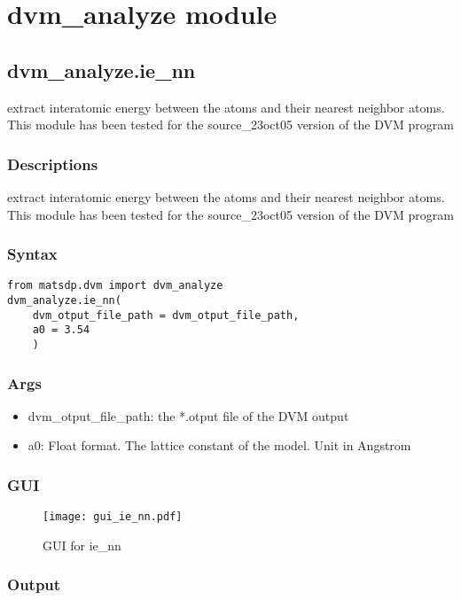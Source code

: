 \documentclass[12pt]{book}
\begin{document}
\section{dvm\_analyze module}

\subsection{dvm\_analyze.ie\_nn}
extract interatomic energy between the atoms and their nearest neighbor atoms. This module has been tested for the source\_23oct05 version of the DVM program

\subsubsection{Descriptions}
extract interatomic energy between the atoms and their nearest neighbor atoms. This module has been tested for the source\_23oct05 version of the DVM program

\subsubsection{Syntax}
\begin{lstlisting}
from matsdp.dvm import dvm_analyze
dvm_analyze.ie_nn(
    dvm_otput_file_path = dvm_otput_file_path,
    a0 = 3.54
    )
\end{lstlisting}
\subsubsection{Args}
\begin{itemize}
\item dvm\_otput\_file\_path: the *.otput file of the DVM output
\item a0: Float format. The lattice constant of the model. Unit in Angstrom
\end{itemize}

\subsubsection{GUI}
\begin{figure}[htbp]
\centering
\texttt{[image: gui\_ie\_nn.pdf]}
\caption{GUI for ie\_nn}
\label{fig:GUI_ie_nn}
\end{figure}

\subsubsection{Output}
\end{document}
